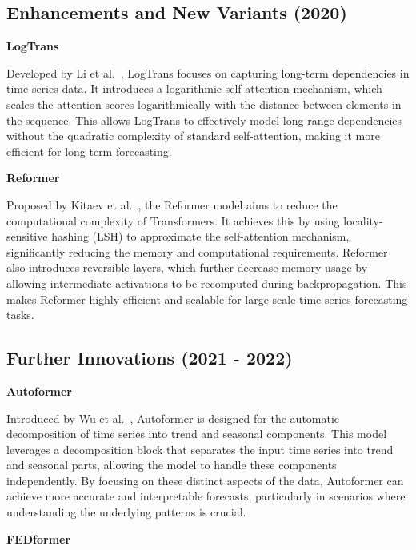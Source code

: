 \subsection{Enhancements and New Variants (2020)}
\noindent\textbf
{LogTrans}

\noindent Developed by Li et al.~\cite{li2020enhancinglocalitybreakingmemory}, LogTrans focuses on capturing long-term dependencies in time series data. It introduces a logarithmic self-attention mechanism, which scales the attention scores logarithmically with the distance between elements in the sequence. This allows LogTrans to effectively model long-range dependencies without the quadratic complexity of standard self-attention, making it more efficient for long-term forecasting.
\vspace{10pt}


\noindent\textbf
{Reformer}
 
\noindent Proposed by Kitaev et al.~\cite{kitaev2020reformerefficienttransformer}, the Reformer model aims to reduce the computational complexity of Transformers. It achieves this by using locality-sensitive hashing (LSH) to approximate the self-attention mechanism, significantly reducing the memory and computational requirements. Reformer also introduces reversible layers, which further decrease memory usage by allowing intermediate activations to be recomputed during backpropagation. This makes Reformer highly efficient and scalable for large-scale time series forecasting tasks.
\vspace{10pt}


\subsection{Further Innovations (2021 - 2022)}
\noindent\textbf
{Autoformer}
 
\noindent Introduced by Wu et al.~\cite{wu2022autoformerdecompositiontransformersautocorrelation}, Autoformer is designed for the automatic decomposition of time series into trend and seasonal components. This model leverages a decomposition block that separates the input time series into trend and seasonal parts, allowing the model to handle these components independently. By focusing on these distinct aspects of the data, Autoformer can achieve more accurate and interpretable forecasts, particularly in scenarios where understanding the underlying patterns is crucial.
\vspace{10pt}


\noindent\textbf
{FEDformer}
 
